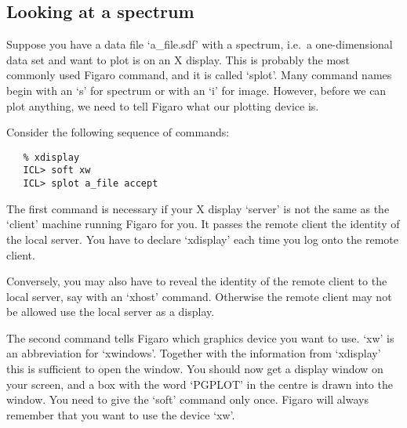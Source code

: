 
\subsection{\label{lookspec}Looking at a spectrum}

   Suppose you have a data file `a\_file.sdf' with a spectrum, i.e.\ a
   one-dimensional data set and want to plot is on an X display. This is
   probably the most commonly used Figaro command, and it is called
   `splot'. Many command names begin with an `s' for spectrum or with
   an `i' for image. However, before we can plot anything, we need to
   tell Figaro what our plotting device is.

   Consider the following sequence of commands:

\begin{verbatim}
   % xdisplay
   ICL> soft xw
   ICL> splot a_file accept
\end{verbatim}

\begin{latexonly}
\begin{figure}[htb]
\begin{center}
\leavevmode{}
\end{center}
\end{figure}
\end{latexonly}

   The first command is necessary if your X display `server' is not
   the same as the `client' machine running Figaro for you. It
   passes the remote client the identity of the local server. You have
   to declare `xdisplay' each time you log onto the remote client.

   Conversely, you may also have to reveal the identity of the remote
   client to the local server, say with an `xhost' command. Otherwise
   the remote client may not be allowed use the local server as a
   display.

   The second command tells Figaro which graphics device you want to
   use. `xw' is an abbreviation for `xwindows'. Together with the
   information from `xdisplay' this is sufficient to open the window.
   You should now get a display window on your screen, and a box with
   the word `PGPLOT' in the centre is drawn into the window. You need
   to give the `soft' command only once. Figaro will always remember
   that you want to use the device `xw'.

